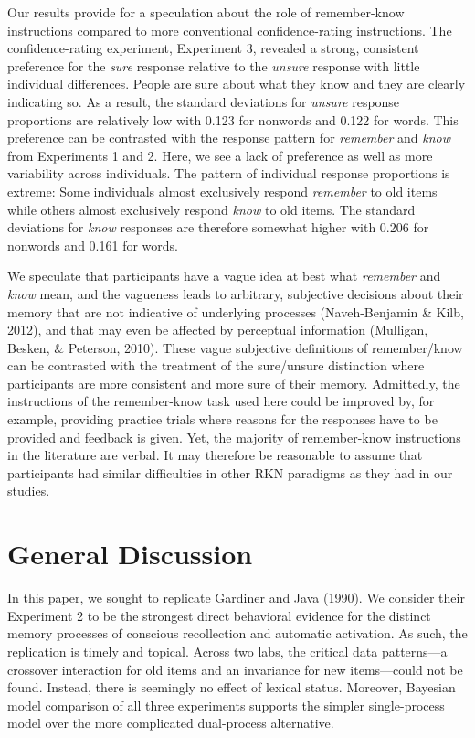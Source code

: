 \documentclass[english,,man]{apa6}
\begin{document}
Our results provide for a speculation about the role of remember-know instructions compared to more conventional confidence-rating instructions. The confidence-rating experiment, Experiment 3, revealed a strong, consistent preference for the \emph{sure} response relative to the \emph{unsure} response with little individual differences. People are sure about what they know and they are clearly indicating so. As a result, the standard deviations for \emph{unsure} response proportions are relatively low with 0.123 for nonwords and 0.122 for words. This preference can be contrasted with the response pattern for \emph{remember} and \emph{know} from Experiments 1 and 2. Here, we see a lack of preference as well as more variability across individuals. The pattern of individual response proportions is extreme: Some individuals almost exclusively respond \emph{remember} to old items while others almost exclusively respond \emph{know} to old items. The standard deviations for \emph{know} responses are therefore somewhat higher with 0.206 for nonwords and 0.161 for words.

We speculate that participants have a vague idea at best what \emph{remember} and \emph{know} mean, and the vagueness leads to arbitrary, subjective decisions about their memory that are not indicative of underlying processes (Naveh-Benjamin \& Kilb, 2012), and that may even be affected by perceptual information (Mulligan, Besken, \& Peterson, 2010). These vague subjective definitions of remember/know can be contrasted with the treatment of the sure/unsure distinction where participants are more consistent and more sure of their memory. Admittedly, the instructions of the remember-know task used here could be improved by, for example, providing practice trials where reasons for the responses have to be provided and feedback is given. Yet, the majority of remember-know instructions in the literature are verbal. It may therefore be reasonable to assume that participants had similar difficulties in other RKN paradigms as they had in our studies.

\hypertarget{general-discussion}{%
\section{General Discussion}\label{general-discussion}}

In this paper, we sought to replicate Gardiner and Java (1990). We consider their Experiment 2 to be the strongest direct behavioral evidence for the distinct memory processes of conscious recollection and automatic activation. As such, the replication is timely and topical.
Across two labs, the critical data patterns---a crossover interaction for old items and an invariance for new items---could not be found. Instead, there is seemingly no effect of lexical status. Moreover, Bayesian model comparison of all three experiments supports the simpler single-process model over the more complicated dual-process alternative.
\end{document}
